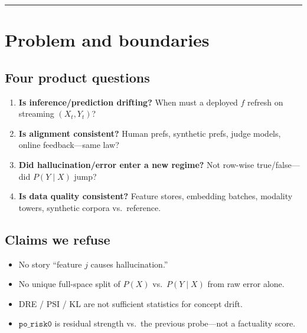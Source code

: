 \documentclass[11pt,a4paper]{article}
\begin{document}
\tableofcontents
\vspace{0.6em}
\noindent\rule{\textwidth}{0.4pt}

\section{Problem and boundaries}
\label{sec:boundary}

\subsection{Four product questions}
\begin{enumerate}
  \item \textbf{Is inference/prediction drifting?} When must a deployed \(\hat f\) refresh on streaming \((X_t,Y_t)\)?
  \item \textbf{Is alignment consistent?} Human prefs, synthetic prefs, judge models, online feedback---same law?
  \item \textbf{Did hallucination/error enter a new regime?} Not row-wise true/false---did \(P(Y\mid X)\) jump?
  \item \textbf{Is data quality consistent?} Feature stores, embedding batches, modality towers, synthetic corpora vs.\ reference.
\end{enumerate}

\subsection{Claims we refuse}
\begin{itemize}
  \item No story ``feature \(j\) causes hallucination.''
  \item No unique full-space split of \(P(X)\) vs.\ \(P(Y\mid X)\) from raw error alone.
  \item DRE / PSI / KL are not sufficient statistics for concept drift.
  \item \(\texttt{po\_risk0}\) is residual strength vs.\ the previous probe---not a factuality score.
\end{itemize}
\end{document}
